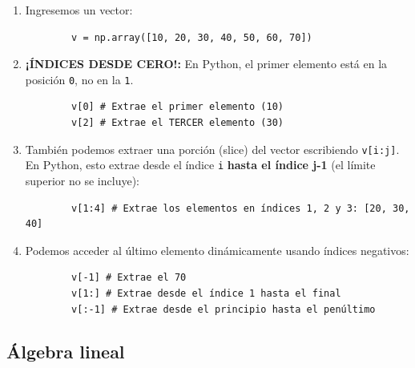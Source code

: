 \begin{enumerate}
	\item Ingresemos un vector:
	\begin{verbatim}
		v = np.array([10, 20, 30, 40, 50, 60, 70])
	\end{verbatim}
	
	\item \textbf{¡ÍNDICES DESDE CERO!:} En Python, el primer elemento está en la posición \texttt{0}, no en la \texttt{1}.
	\begin{verbatim}
		v[0] # Extrae el primer elemento (10)
		v[2] # Extrae el TERCER elemento (30)
	\end{verbatim}
	
	\item También podemos extraer una porción (slice) del vector escribiendo \verb-v[i:j]-. En Python, esto extrae desde el índice \texttt{i} \textbf{hasta el índice j-1} (el límite superior no se incluye):
	\begin{verbatim}
		v[1:4] # Extrae los elementos en índices 1, 2 y 3: [20, 30, 40]
	\end{verbatim}
	
	\item Podemos acceder al último elemento dinámicamente usando índices negativos:
	\begin{verbatim}
		v[-1] # Extrae el 70
		v[1:] # Extrae desde el índice 1 hasta el final
		v[:-1] # Extrae desde el principio hasta el penúltimo
	\end{verbatim}
\end{enumerate}

\subsection{Álgebra lineal}

